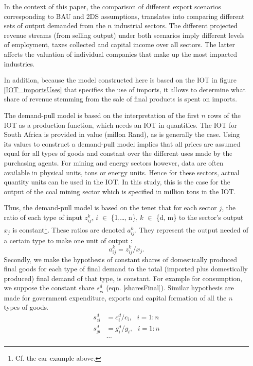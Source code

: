 \documentclass[12pt,english]{article}
\begin{document}
In the context of this paper, the comparison of different export scenarios corresponding to BAU and 2DS assumptions, translates into comparing different sets of output demanded from the $n$ industrial sectors. The different projected revenue streams (from selling output) under both scenarios imply different levels of employment, taxes collected and capital income over all sectors. The latter affects the valuation of individual companies that make up the most impacted industries. 

In addition, because the model constructed here is based on the IOT in figure \ref{IOT_importsUses} that specifies the use of imports, it allows to determine what share of revenue stemming from the sale of final products is spent on imports. 

The demand-pull model is based on the interpretation of the first $n$ rows of the IOT as a production function, which needs an IOT in quantities. The IOT for South Africa is provided in value (millon Rand), as is generally the case. Using its values to construct a demand-pull model implies that all prices are assumed equal for all types of goods and constant over the different uses made by the purchasing agents. For mining and energy sectors however, data are often available in physical units, tons or energy units. Hence for these sectors, actual quantity units can be used in the IOT. In this study, this is the case for the output of the coal mining sector which is specified in million tons in the IOT.

Thus, the demand-pull model is based on the tenet that for each sector $j$, the ratio of each type of input $z_{ij}^k$, $i$ $\in$ \{1,\ldots, n\}, $k$ $\in$ \{d, m\} to the sector's output $x_j$ is constant\footnote{Cf. the car example above.}. These ratios are denoted $a_{ij}^k$. They represent the output needed of a certain type to make one unit of output : 
\begin{equation}
a_{ij}^k = z_{ij}^k/x_j. \label{sharesIntermediate}
\end{equation}
Secondly, we make the hypothesis of constant shares of domestically produced final goods for each type of final demand to the %
total (imported plus domestically produced) final demand of that type, is constant. For example for consumption, we suppose the constant share $s^d_{ci}$ (eqn. \ref{sharesFinal}). Similar hypothesis are made for government expenditure, exports and capital formation of all the $n$ types of goods.
\begin{align}
s^d_{ci}&=c_i^d/c_i, \ \ \  i=1:n \label{sharesFinal}\\
s^d_{gi}&=g_i^d/g_i, \ \ \  i=1:n \nonumber\\
&\ldots \nonumber
\end{align} 
\end{document}
